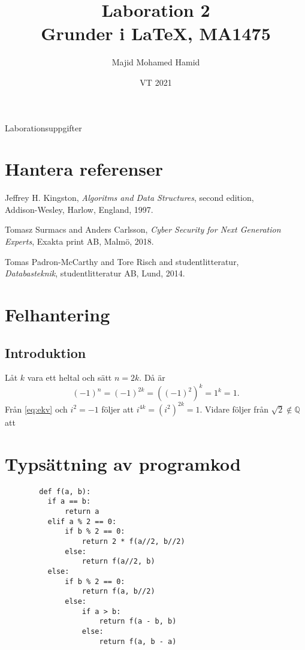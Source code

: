\documentclass[a4paper, titlepage]{article}
\title{Laboration 2\\Grunder i \LaTeX, MA1475}%
\author{Majid Mohamed Hamid}
\date{VT 2021}
\begin{document}
	\maketitle
	\begin{center} 
		Laborationsuppgifter 
	\end{center}
	
	\section{Hantera referenser}

	
	\begin{thebibliography}{0}
		 Jeffrey H. 
Kingston, \emph{Algoritms and Data Structures}, second edition,\\ Addison-Wesley, Harlow, England, 1997.
		
		 Tomasz Surmacs and Anders Carlsson, \emph{Cyber Security for Next Generation\\Experts}, Exakta print AB, Malmö, 2018.
		
		 Tomas Padron-McCarthy and Tore Risch and studentlitteratur, \\\emph{Databasteknik}, studentlitteratur AB, Lund, 2014. 

	\end{thebibliography}
	
	\section{Felhantering}

	\subsection*{Introduktion}

	Låt $k$ vara ett heltal och sätt $n = 2k$. 
Då är
	\begin{equation}\label{eq:ekv}
		(-1)^n = (-1)^{2k} = ((-1)^2)^k = 1^k = 1.
	\end{equation}
	Från \ref{eq:ekv} och $i^2 = -1$ följer att $i^{4k} = (i^2)^{2k} = 1.$ 
	Vidare följer från $\sqrt{2} \notin \mathbb{Q}$ att
	
	
	\section{Typsättning av programkod}

	\begin{verbatim}
		def f(a, b):
		  if a == b:
		      return a
		  elif a % 2 == 0:
		      if b % 2 == 0:
		          return 2 * f(a//2, b//2)
		      else:
		          return f(a//2, b)
		  else:
		      if b % 2 == 0:
		          return f(a, b//2)
		      else:
		          if a > b:
		              return f(a - b, b)
		          else:
		              return f(a, b - a)
	\end{verbatim}                
	
\end{document}
